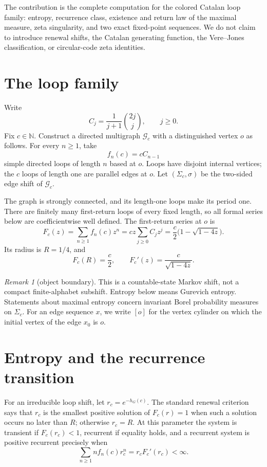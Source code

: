 \documentclass[11pt,a4paper]{amsart}
\theoremstyle{definition}
\theoremstyle{remark}
\newtheorem{remark}[theorem]{Remark}
\newcommand{\N}{\mathbb N}
\begin{document}
The contribution is the complete computation for the colored Catalan loop
family: entropy, recurrence class, existence and return law of the maximal
measure, zeta singularity, and two exact fixed-point sequences.  We do not
claim to introduce renewal shifts, the Catalan generating function, the
Vere--Jones classification, or circular-code zeta identities.

\section{The loop family}

Write
\[
 C_j=\frac{1}{j+1}\binom{2j}{j},\qquad j\geq0.
\]
Fix $c\in\N$.  Construct a directed multigraph $\mathcal G_c$ with a
distinguished vertex $o$ as follows.  For every $n\geq1$, take
\[
 f_n(c)=cC_{n-1}
\]
simple directed loops of length $n$ based at $o$.  Loops have disjoint
internal vertices; the $c$ loops of length one are parallel edges at $o$.
Let $(\Sigma_c,\sigma)$ be the two-sided edge shift of $\mathcal G_c$.

The graph is strongly connected, and its length-one loops make its period
one.  There are finitely many first-return loops of every fixed length, so
all formal series below are coefficientwise well defined.  The first-return
series at $o$ is
\begin{equation}\label{eq:first-return}
 F_c(z)=\sum_{n\geq1}f_n(c)z^n
 =cz\sum_{j\geq0}C_jz^j
 =\frac c2\bigl(1-\sqrt{1-4z}\bigr).
\end{equation}
Its radius is $R=1/4$, and
\begin{equation}\label{eq:boundary-data}
 F_c(R)=\frac c2,\qquad
 F_c'(z)=\frac{c}{\sqrt{1-4z}}.
\end{equation}

\begin{remark}[object boundary]
This is a countable-state Markov shift, not a compact finite-alphabet
subshift.  Entropy below means Gurevich entropy.  Statements about maximal
entropy concern invariant Borel probability measures on $\Sigma_c$.
For an edge sequence $x$, we write $[o]$ for the vertex cylinder on which
the initial vertex of the edge $x_0$ is $o$.
\end{remark}

\section{Entropy and the recurrence transition}

For an irreducible loop shift, let $r_c=e^{-h_G(c)}$.  The standard renewal
criterion says that $r_c$ is the smallest positive solution of $F_c(r)=1$
when such a solution occurs no later than $R$; otherwise $r_c=R$.  At this
parameter the system is transient if $F_c(r_c)<1$, recurrent if equality
holds, and a recurrent system is positive recurrent precisely when
\begin{equation}\label{eq:mean-test}
 \sum_{n\geq1}n f_n(c)r_c^n=r_cF_c'(r_c)<\infty.
\end{equation}
\end{document}

